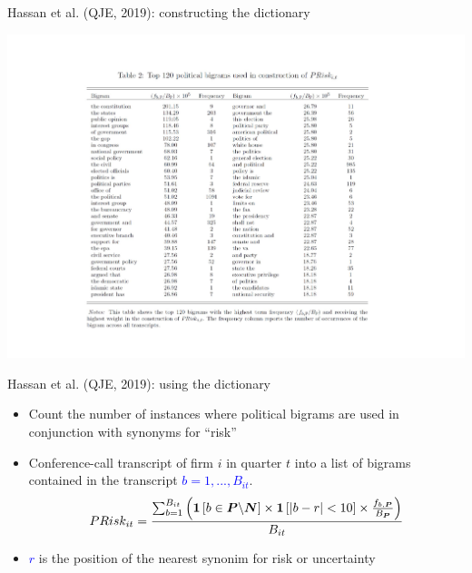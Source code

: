 \documentclass[english]{beamer}
\begin{document}
\begin{frame}{Hassan et al. (QJE, 2019): constructing the dictionary}
\vspace{-7pt}
\begin{center}
\includegraphics[scale=0.5]{Images/hassan_et_al_table1.pdf}
\end{center}
\end{frame}

\begin{frame}{Hassan et al. (QJE, 2019): using the dictionary}
\begin{itemize}
\setlength{\itemsep}{1.5em}
\item Count the number of instances where political bigrams are used in conjunction with synonyms for ``risk''
\item Conference-call transcript of firm $i$ in quarter $t$ into a list of bigrams contained in the transcript \textcolor{blue}{$b=1,...,B_{it}$}.
\vspace{7pt}
\textcolor{blue}{\begin{equation*}
PRisk_{it}=\frac{\sum_{b=1}^{B_{it}}\left( \boldsymbol{1}\left[ b\in 
\boldsymbol{P}\backslash \boldsymbol{N}\right] \times \boldsymbol{1}\left[
\left\vert b-r\right\vert <10\right] \times \frac{f_{b,\boldsymbol{P}}}{B_{%
\boldsymbol{P}}}\right) }{B_{it}}
\end{equation*}}
\item \textcolor{blue}{$r$} is the position of the nearest synonim for risk or uncertainty
\end{itemize}
\end{frame}%
\end{document}
